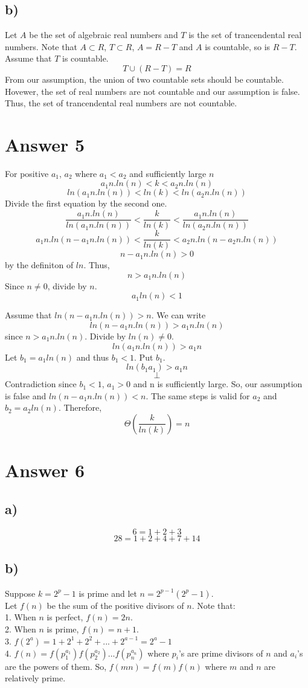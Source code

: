\documentclass[12pt]{article}
\begin{document}
\subsection*{b)}
Let $A$ be the set of algebraic real numbers and $T$ is the set of trancendental real numbers. Note that $A \subset R$, $T \subset R$, $A=R-T$ and $A$ is countable, so is $R-T$. Assume that $T$ is countable.
$$T \cup (R-T) = R$$
From our assumption, the union of two countable sets should be countable. Hovewer, the set of real numbers are not countable and our assumption is false. Thus, the set of trancendental real numbers are not countable.

\section*{Answer 5}
For positive $a_1$, $a_2$ where $a_1 < a_2$ and sufficiently large $n$
$$a_1n.ln(n) < k < a_2n.ln(n)$$
$$ln(a_1n.ln(n)) <ln(k) <ln(a_2n.ln(n))$$
Divide the first equation by the second one.
$$\dfrac{a_1n.ln(n)}{ln(a_1n.ln(n))}<\dfrac{k}{ln(k)}<\dfrac{a_1n.ln(n)}{ln(a_2n.ln(n))}$$
$$a_1n.ln(n-a_1n.ln(n)) < \dfrac{k}{ln(k)} < a_2n.ln(n-a_2n.ln(n))$$
$$n-a_1n.ln(n)>0$$ by the definiton of $ln$. Thus,
$$n>a_1n.ln(n)$$
Since $n \neq 0$, divide by $n$.
$$a_1ln(n)<1$$

Assume that $ln(n-a_1n.ln(n))>n$. We can write
$$ln(n-a_1n.ln(n))>a_1n.ln(n)$$
since $n>a_1n.ln(n)$.
Divide by $ln(n) \neq 0$.
$$ln(a_1n.ln(n))>a_1n$$
Let $b_1=a_1ln(n)$ and thus $b_1<1$. Put $b_1$.
$$ln(b_1a_1)>a_1n$$
$$\perp$$
Contradiction since $b_1<1$, $a_1>0$ and n is sufficiently large.
So, our assumption is false and $ln(n-a_1n.ln(n))<n$. The same steps is valid for $a_2$ and $b_2=a_2ln(n)$. Therefore,
$$\Theta (\dfrac{k}{ln(k)}) = n$$

\section*{Answer 6}
\subsection*{a)}
$$6=1+2+3$$
$$28=1+2+4+7+14$$
\subsection*{b)}
Suppose $k=2^p-1$ is prime and let $n=2^{p-1}(2^p-1)$.\\
Let $f(n)$ be the sum of the positive divisors of $n$. Note that:\\
1. When $n$ is perfect, $f(n)=2n$.\\
2. When $n$ is prime, $f(n)=n+1$.\\
3. $f(2^a)=1+2^1+2^2+...+2^{a-1}=2^a-1$\\
4. $f(n)=f(p_1^{a_1})f(p_2^{a_2})...f(p_n^{a_n})$ where $p_i$'s are prime divisors of $n$ and $a_i$'s are the powers of them. So, $f(mn)=f(m)f(n)$ where $m$ and $n$ are relatively prime.\\
\end{document}
